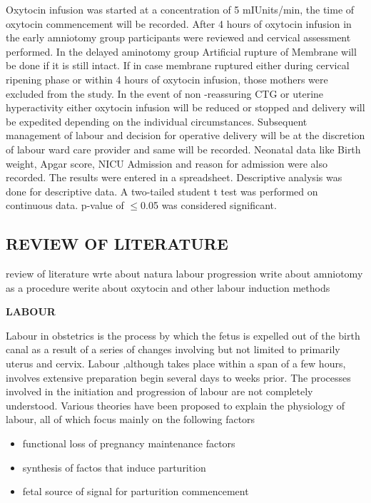 \documentclass[14pt]{extarticle}
\begin{document}
Oxytocin infusion was started at a concentration of 5 mIUnits/min, the time of oxytocin commencement will be recorded. After 4 hours of oxytocin infusion in the early amniotomy group participants were reviewed and cervical  assessment performed. In the delayed aminotomy group Artificial rupture of Membrane will be done  if it is still intact. If in case membrane ruptured either during cervical ripening phase or within 4 hours of oxytocin infusion, those mothers were excluded from the study. In the event of non -reassuring CTG or uterine hyperactivity either oxytocin infusion will be reduced or stopped and delivery will be expedited depending on the individual circumstances. Subsequent management of labour and decision for operative delivery will be at the discretion of labour ward care provider and same will be recorded. Neonatal data like Birth weight, Apgar score, NICU Admission and reason for admission were also recorded. The results were entered in a spreadsheet. Descriptive analysis was done for descriptive data. A two-tailed student t test was performed on continuous data. p-value of $\leq$0.05 was considered significant.

\newpage
\null
\vfill
\begin{flushright}
    \section{REVIEW OF LITERATURE}
\end{flushright}
\hrulefill
\newpage

review of literature
wrte about natura labour progression
write about amniotomy as a procedure
werite about oxytocin
and other labour induction methods

\textbf{LABOUR}

Labour in obstetrics is the process by which the fetus is expelled out of the birth canal as a result of a series of changes involving but not limited to primarily uterus and cervix. Labour ,although takes place within a span of a few hours, involves extensive preparation begin several days to weeks prior. The processes involved in the initiation and progression of labour are not completely understood. Various theories have been proposed to explain the physiology of labour, all of which focus mainly on the following factors 

\begin{itemize}
    \item functional loss of pregnancy maintenance factors
    \item synthesis of factos that induce parturition
    \item fetal source of signal for parturition commencement
\end{itemize}
\end{document}
